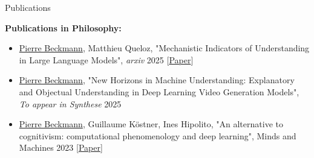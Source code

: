 \documentclass[]{mcdowellcv}
\begin{document}
\begin{cvsection}{Publications}
    \begin{cvsubsection}{}{}{}
        
        \textbf{Publications in Philosophy:} \vspace{0.1cm}
        \begin{itemize}
            \item \underline{Pierre Beckmann}, Matthieu Queloz, "Mechanistic Indicators of Understanding in Large Language Models", \textit{arxiv} 2025 [\href{https://arxiv.org/abs/2507.08017}{Paper}]
        \end{itemize}
        \begin{itemize}
            \item \underline{Pierre Beckmann}, "New Horizons in Machine Understanding: Explanatory and Objectual Understanding in Deep Learning Video Generation Models", \textit{To appear in Synthese} 2025
        \end{itemize}
        \begin{itemize}
            \item \underline{Pierre Beckmann}, Guillaume Köstner, Ines Hipolito, "An alternative to cognitivism: computational phenomenology and deep learning", Minds and Machines 2023 [\href{https://link.springer.com/article/10.1007/s11023-023-09638-w}{Paper}]
        \end{itemize}
        


\end{cvsubsection}
\end{cvsection}
\end{document}
